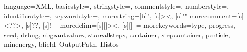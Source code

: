 \usepackage{color}
\usepackage{listings}

{
  language=XML,
  basicstyle=\ttfamily,
  stringstyle=\color{blue},
  commentstyle=\color{olive},
  numberstyle=\tiny\color{violet},
  identifierstyle=\color{blue},
  keywordstyle=\color{magenta},
  morestring={[b]", [s]{>}{<}, [s]{"}{"}}
  morecomment={[s]{<?}{?>}, [s]{?}{?}, [s]{!--}{--}}
  moredelim={[s][\color{black}]{>}{<}, [s][\color{red}]{\ }{=}}
  morekeywords={type, progress, seed, debug, cbgeantvalues, storeallsteps, container, stepcontainer, particle, minenergy, bfield, OutputPath, Histos}
}

